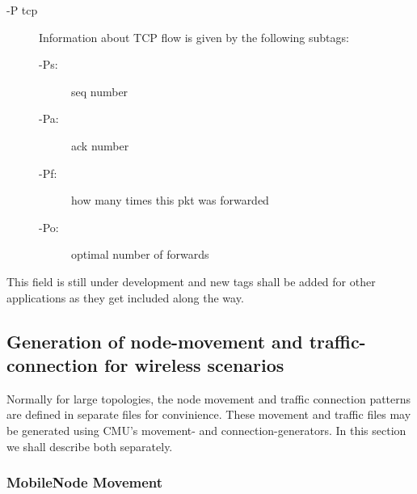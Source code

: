 \begin{description}
\begin{description}
\item[-P tcp] Information about TCP flow is given by the following
subtags:

\begin{description}
\item[-Ps:] seq number
\item[-Pa:] ack number
\item[-Pf:] how many times this pkt was forwarded
\item[-Po:] optimal number of forwards 
\end{description}
\end{description}

This field is still under development and new tags shall be added for
other applications as they get included along the way.
\end{description}


\subsection{Generation of node-movement and traffic-connection for wireless scenarios}
\label{sec:mobile-scen-generator}

Normally for large topologies, the node movement and traffic connection
patterns are defined in separate files for convinience. These movement and
traffic files may be generated using CMU's movement- and
connection-generators. In this section we shall describe both separately.

\subsubsection{MobileNode Movement}
\label{sec:mobile-movement-file}

